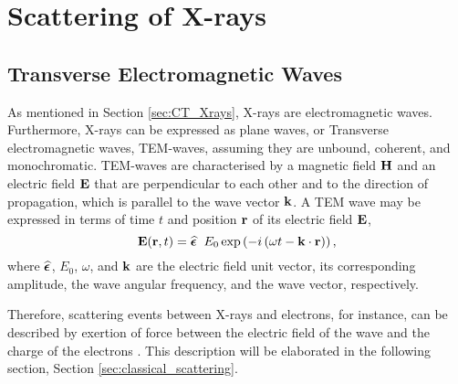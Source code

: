 \chapter{Scattering of X-rays}
\label{ch:scattering}
\section{Transverse Electromagnetic Waves}
As mentioned in Section \ref{sec:CT_Xrays}, X-rays are electromagnetic waves.
Furthermore, X-rays can be expressed as plane waves, or Transverse electromagnetic waves, TEM-waves, assuming they are unbound, coherent, and monochromatic.
TEM-waves are characterised by a magnetic field $\bm{\mathrm{H}}$ and an electric field $\bm{\mathrm{E}}$ that are perpendicular to each other and to the direction of propagation, which is parallel to the wave vector $\bm{\mathrm{k}}$.
A TEM wave may be expressed in terms of time $t$ and position $\bm{\mathrm{r}}$ of its electric field $\bm{\mathrm{E}}$,
\begin{equation}\label{eq:TEM_wave}
    \bm{\mathrm{E}}(\bm{\mathrm{r}},t) = \mathrm{\boldsymbol{\widehat{\epsilon}}} \left. \right.  E_{0} \exp\left(-i\left(\omega t - \bm{\mathrm{k}}\cdot\bm{\mathrm{r}}\right)\right),
\end{equation}
where $\mathrm{\boldsymbol{\widehat{\epsilon}}}$, $E_{0}$, $\omega$, and $\bm{\mathrm{k}}$ are the electric field unit vector, its corresponding amplitude, the wave angular frequency, and the wave vector, respectively.

Therefore, scattering events between X-rays and electrons, for instance, can be described by
exertion of force between the electric field of the wave and the charge of the electrons \cite{mcmorrow2011elements}.
This description will be elaborated in the following section, Section \ref{sec:classical_scattering}.


